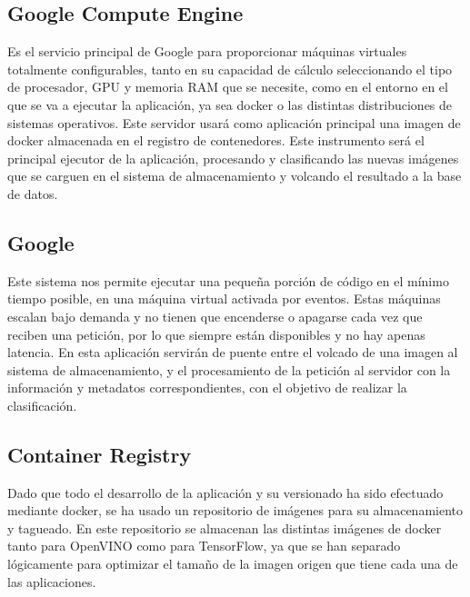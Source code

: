\subsection{Google Compute Engine}\label{subsec:computeengine}
Es el servicio principal de Google para proporcionar máquinas virtuales totalmente configurables, tanto en su capacidad de cálculo seleccionando el tipo de procesador, GPU y memoria RAM que se necesite, como en el entorno
en el que se va a ejecutar la aplicación, ya sea docker o las distintas distribuciones de sistemas operativos.
Este servidor usará como aplicación principal una imagen de docker almacenada en el registro de contenedores.
Este instrumento será el principal ejecutor de la aplicación, procesando y clasificando las nuevas imágenes que se carguen en el sistema de almacenamiento y volcando el resultado a la base de datos.
\subsection{Google }\label{subsec:cloudfunction}
Este sistema nos permite ejecutar una pequeña porción de código en el mínimo tiempo posible, en una máquina virtual activada por eventos.
Estas máquinas escalan bajo demanda y no tienen que encenderse o apagarse cada vez que reciben una petición, por lo que siempre están disponibles y no hay apenas latencia.
En esta aplicación servirán de puente entre el volcado de una imagen al sistema de almacenamiento, y el procesamiento de la petición al servidor con la información y metadatos correspondientes, con el objetivo de realizar la clasificación.
\subsection{Container Registry}\label{subsec:container-registry}
Dado que todo el desarrollo de la aplicación y su versionado ha sido efectuado mediante docker, se ha usado un repositorio de imágenes para su almacenamiento y tagueado.
En este repositorio se almacenan las distintas imágenes de docker tanto para OpenVINO como para TensorFlow, ya que se han separado lógicamente para optimizar el tamaño de la imagen origen que tiene cada una de las aplicaciones.

